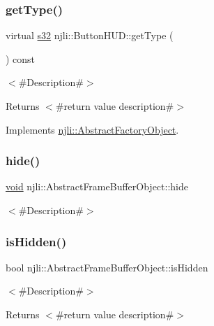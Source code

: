 \subsubsection{\texorpdfstring{get\+Type()}{getType()}}
{\footnotesize\ttfamily virtual \mbox{\hyperlink{_util_8h_aa62c75d314a0d1f37f79c4b73b2292e2}{s32}} njli\+::\+Button\+H\+U\+D\+::get\+Type (\begin{DoxyParamCaption}{ }\end{DoxyParamCaption}) const\hspace{0.3cm}{\ttfamily [virtual]}}

$<$\#\+Description\#$>$

\begin{DoxyReturn}{Returns}
$<$\#return value description\#$>$ 
\end{DoxyReturn}


Implements \mbox{\hyperlink{classnjli_1_1_abstract_factory_object_a207c86146d40d0794708ae7f2d4e60a7}{njli\+::\+Abstract\+Factory\+Object}}.

\mbox{\label{classnjli_1_1_button_h_u_d_a5d7b8b3bc421084f282343e506a6d289}} 
\subsubsection{\texorpdfstring{hide()}{hide()}}
{\footnotesize\ttfamily \mbox{\hyperlink{_thread_8h_af1e856da2e658414cb2456cb6f7ebc66}{void}} njli\+::\+Abstract\+Frame\+Buffer\+Object\+::hide}

$<$\#\+Description\#$>$ \mbox{\label{classnjli_1_1_button_h_u_d_a3009efb11b4bcd56bd933c21b230a125}} 
\subsubsection{\texorpdfstring{is\+Hidden()}{isHidden()}}
{\footnotesize\ttfamily bool njli\+::\+Abstract\+Frame\+Buffer\+Object\+::is\+Hidden}

$<$\#\+Description\#$>$

\begin{DoxyReturn}{Returns}
$<$\#return value description\#$>$ 
\end{DoxyReturn}
\mbox{\label{classnjli_1_1_button_h_u_d_a2584ca1f6eb5a9dd7db13261f7a01cb3}} 
